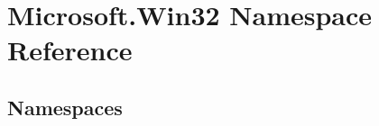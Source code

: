 \hypertarget{namespace_microsoft_1_1_win32}{}\section{Microsoft.\+Win32 Namespace Reference}
\label{namespace_microsoft_1_1_win32}
\subsection*{Namespaces}
\begin{DoxyCompactItemize}
\end{DoxyCompactItemize}
